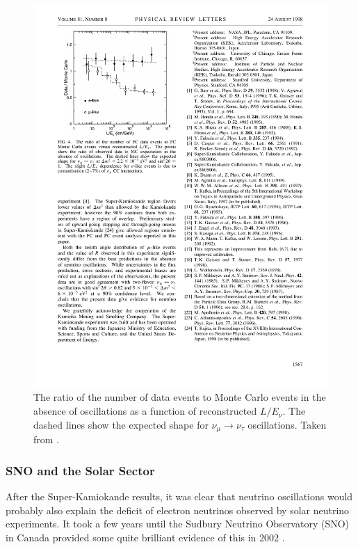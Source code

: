 \begin{figure}
  \centering
  \includegraphics{SuperKamiokandeLE.pdf}
  \caption{The ratio of the number of data events to Monte Carlo events in the absence of oscillations as a function of reconstructed $L/E_{\nu}$.  The dashed lines show the expected shape for $\nu_{\mu}\rightarrow\nu_{\tau}$ oscillations.  Taken from \cite{SuperKamiokande1998}.}
  \label{fig:SuperKamiokandeLE}
\end{figure}

\subsubsection{SNO and the Solar Sector}\label{sec:SNO}

After the Super-Kamiokande results, it was clear that neutrino oscillations would probably also explain the deficit of electron neutrinos observed by solar neutrino experiments.  It took a few years until the Sudbury Neutrino Observatory (SNO) in Canada provided some quite brilliant evidence of this in 2002 \cite{SNO2002}.

